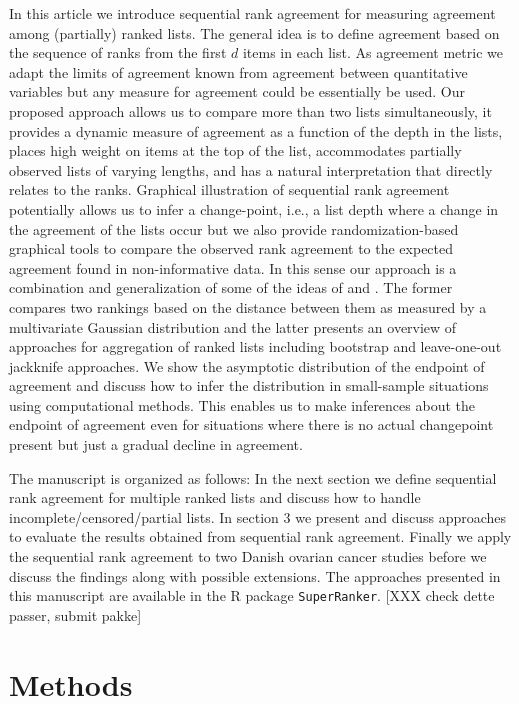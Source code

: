 \documentclass[12pt,a4paper]{article}
\theoremstyle{plain}
\begin{document}
In this article we introduce sequential rank agreement for measuring
agreement among (partially) ranked lists.  The general idea is to
define agreement based on the sequence of ranks from the first $d$
items in each list. As agreement metric we adapt the limits of
agreement known from agreement between quantitative variables
\citep{alt:bland:1983,Carstensen2010} but any measure for agreement
could be essentially be used. Our proposed approach allows us to
compare more than two lists simultaneously, it provides a dynamic
measure of agreement as a function of the depth in the lists, places
high weight on items at the top of the list, accommodates partially
observed lists of varying lengths, and has a natural interpretation
that directly relates to the ranks.  Graphical illustration of
sequential rank agreement potentially allows us to infer a
change-point, i.e., a list depth where a change in the agreement of
the lists occur but we also provide randomization-based graphical
tools to compare the observed rank agreement to the expected agreement
found in non-informative data.  In this sense our approach is a
combination and generalization of some of the ideas of
\citet{Carterette2009} and \citet{Boulesteix2009}. The former compares
two rankings based on the distance between them as measured by a
multivariate Gaussian distribution and the latter presents an overview
of approaches for aggregation of ranked lists including bootstrap and
leave-one-out jackknife approaches. We show the asymptotic
distribution of the endpoint of agreement and discuss how to infer the
distribution in small-sample situations using computational
methods. This enables us to make inferences about the endpoint of
agreement even for situations where there is no actual changepoint
present but just a gradual decline in agreement.

The manuscript is organized as follows: In the next section we define
sequential rank agreement for multiple ranked lists and discuss how to
handle incomplete/censored/partial lists. In section 3 we present and
discuss approaches to evaluate the results obtained from sequential
rank agreement. Finally we apply the sequential rank agreement to two
Danish ovarian cancer studies before we discuss the findings along
with possible extensions. The approaches presented in this manuscript
are available in the R package \texttt{SuperRanker}. [XXX check dette
passer, submit pakke]


\section{Methods}
\end{document}
